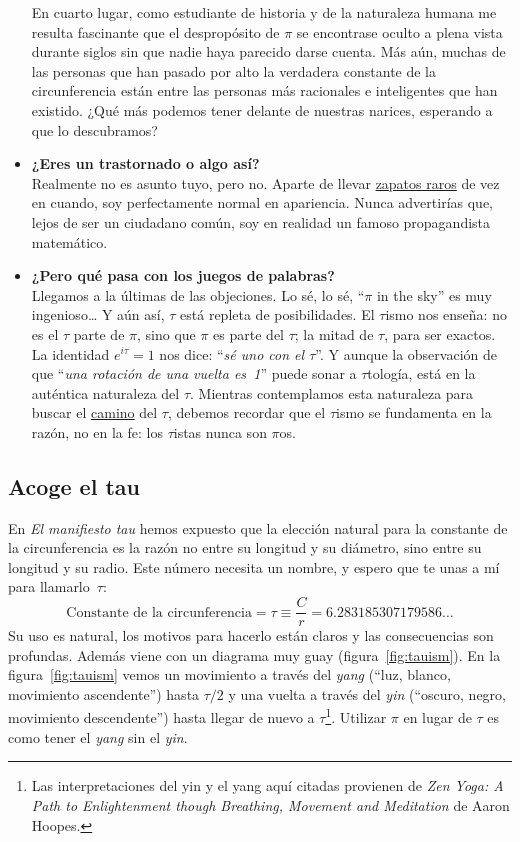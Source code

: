 \begin{itemize}
En cuarto lugar, como estudiante de historia y de la naturaleza humana me resulta fascinante que el despropósito de $\pi$ se encontrase oculto a plena vista durante siglos sin que nadie haya parecido darse cuenta.  Más aún, muchas de las personas que han pasado por alto la verdadera constante de la circunferencia están entre las personas más racionales e inteligentes que han existido. ¿Qué más podemos tener delante de nuestras narices, esperando a que lo descubramos?


  \item \textbf{¿Eres un trastornado o algo así?} \\ Realmente no es asunto tuyo, pero no. Aparte de llevar \href{http://www.vibramfivefingers.com/}{zapatos raros} de vez en cuando, soy perfectamente normal en apariencia. Nunca advertirías que, lejos de ser un ciudadano común, soy en realidad un famoso propagandista matemático.


  \item \textbf{¿Pero qué pasa con los juegos de palabras?} \\ Llegamos a la últimas de las objeciones. Lo sé, lo sé, ``$\pi$ in the sky'' es muy ingenioso\ldots
Y aún así, $\tau$ está repleta de posibilidades. El $\tau$ismo nos enseña: no es el $\tau$ parte de $\pi$, sino que $\pi$ es parte del $\tau$; la mitad de $\tau$, para ser exactos. La identidad $e^{i\tau} = 1$ nos dice: ``\emph{sé uno con el $\tau$}''. Y aunque la observación de que ``\emph{una rotación de una vuelta es~1}'' puede sonar a $\tau$tología, está en la auténtica naturaleza del $\tau$. Mientras contemplamos esta naturaleza para buscar el \href{https://es.wikipedia.org/wiki/Tao}{camino} del $\tau$, debemos recordar que el $\tau$ismo se fundamenta en la razón, no en la fe: los $\tau$istas nunca son $\pi$os.


\end{itemize}


  \subsection{Acoge el tau} %
  \label{sec:embrace_the_tau}

En \emph{El manifiesto tau} hemos expuesto que la elección natural para la constante de la circunferencia es la razón no entre su longitud y su diámetro, sino entre su longitud y su radio. Este número necesita un nombre, y espero que te unas a mí para llamarlo~$\tau$:
\[
  \mbox{Constante de la circunferencia} = \tau \equiv \frac{C}{r} = 6.283185307179586\ldots
\]
Su uso es natural, los motivos para hacerlo están claros y las consecuencias son profundas. Además viene con un diagrama muy guay (figura~\ref{fig:tauism}). En la figura~\ref{fig:tauism} vemos un movimiento a través del \emph{yang} (``luz, blanco, movimiento ascendente'') hasta $\tau/2$ y una vuelta a través del \emph{yin} (``oscuro, negro, movimiento descendente'') hasta llegar de nuevo a $\tau$\footnote{Las interpretaciones del yin y el yang aquí citadas provienen de \emph{Zen Yoga: A Path to Enlightenment though Breathing, Movement and Meditation} de Aaron Hoopes.}. Utilizar $\pi$ en lugar de $\tau$ es como tener el \emph{yang} sin el \emph{yin}.

